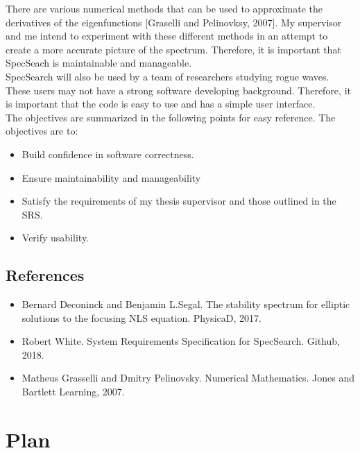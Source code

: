 \documentclass[12pt, titlepage]{article}
\begin{document}
	There are various numerical methods that can be used to approximate the 
	derivatives of the eigenfunctions [Graselli and Pelinovksy, 2007]. My 
	supervisor and me intend to experiment with these different 
	methods in an attempt to create a more accurate picture of the spectrum. 
	Therefore, it is important that SpecSeach is maintainable and 
	manageable. \\
	
	 SpecSearch will also be used by a team of researchers studying rogue 
	 waves. These users may not have a strong software 
	 developing background. Therefore, it is important that the code is easy to 
	 use and has a simple user interface. \\
	 
	 The objectives are summarized in the following points for easy reference. 
	 The objectives are to:
	
\begin{itemize}
	\item Build confidence in software correctness.
	\item Ensure maintainability and manageability 
	\item Satisfy the requirements of my thesis supervisor and those outlined 
	in the SRS. 
	\item Verify usability.	
\end{itemize}

\subsection{References}
\label{REF1}

\begin{itemize} 

	\item 	Bernard Deconinck and Benjamin L.Segal. 
	The stability spectrum for elliptic solutions to the focusing NLS equation. 
	PhysicaD, 2017.  
	\item Robert White. System Requirements Specification for SpecSearch. 
	Github, 2018.
	\item Matheus Grasselli and Dmitry Pelinovsky. Numerical Mathematics. Jones 
	and Bartlett Learning, 2007.
	
\end{itemize}

\section{Plan}
	 
\end{document}
